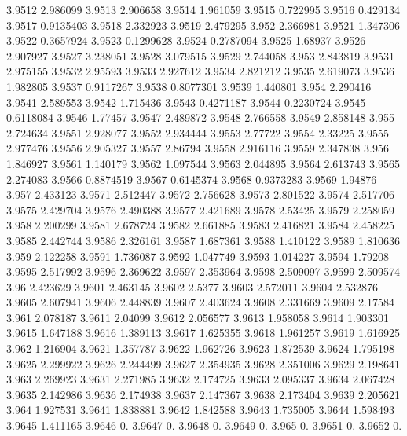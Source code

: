3.9512  2.986099
3.9513  2.906658
3.9514  1.961059
3.9515  0.722995
3.9516  0.429134
3.9517  0.9135403
3.9518  2.332923
3.9519  2.479295
3.952  2.366981
3.9521  1.347306
3.9522  0.3657924
3.9523  0.1299628
3.9524  0.2787094
3.9525  1.68937
3.9526  2.907927
3.9527  3.238051
3.9528  3.079515
3.9529  2.744058
3.953  2.843819
3.9531  2.975155
3.9532  2.95593
3.9533  2.927612
3.9534  2.821212
3.9535  2.619073
3.9536  1.982805
3.9537  0.9117267
3.9538  0.8077301
3.9539  1.440801
3.954  2.290416
3.9541  2.589553
3.9542  1.715436
3.9543  0.4271187
3.9544  0.2230724
3.9545  0.6118084
3.9546  1.77457
3.9547  2.489872
3.9548  2.766558
3.9549  2.858148
3.955  2.724634
3.9551  2.928077
3.9552  2.934444
3.9553  2.77722
3.9554  2.33225
3.9555  2.977476
3.9556  2.905327
3.9557  2.86794
3.9558  2.916116
3.9559  2.347838
3.956  1.846927
3.9561  1.140179
3.9562  1.097544
3.9563  2.044895
3.9564  2.613743
3.9565  2.274083
3.9566  0.8874519
3.9567  0.6145374
3.9568  0.9373283
3.9569  1.94876
3.957  2.433123
3.9571  2.512447
3.9572  2.756628
3.9573  2.801522
3.9574  2.517706
3.9575  2.429704
3.9576  2.490388
3.9577  2.421689
3.9578  2.53425
3.9579  2.258059
3.958  2.200299
3.9581  2.678724
3.9582  2.661885
3.9583  2.416821
3.9584  2.458225
3.9585  2.442744
3.9586  2.326161
3.9587  1.687361
3.9588  1.410122
3.9589  1.810636
3.959  2.122258
3.9591  1.736087
3.9592  1.047749
3.9593  1.014227
3.9594  1.79208
3.9595  2.517992
3.9596  2.369622
3.9597  2.353964
3.9598  2.509097
3.9599  2.509574
3.96  2.423629
3.9601  2.463145
3.9602  2.5377
3.9603  2.572011
3.9604  2.532876
3.9605  2.607941
3.9606  2.448839
3.9607  2.403624
3.9608  2.331669
3.9609  2.17584
3.961  2.078187
3.9611  2.04099
3.9612  2.056577
3.9613  1.958058
3.9614  1.903301
3.9615  1.647188
3.9616  1.389113
3.9617  1.625355
3.9618  1.961257
3.9619  1.616925
3.962  1.216904
3.9621  1.357787
3.9622  1.962726
3.9623  1.872539
3.9624  1.795198
3.9625  2.299922
3.9626  2.244499
3.9627  2.354935
3.9628  2.351006
3.9629  2.198641
3.963  2.269923
3.9631  2.271985
3.9632  2.174725
3.9633  2.095337
3.9634  2.067428
3.9635  2.142986
3.9636  2.174938
3.9637  2.147367
3.9638  2.173404
3.9639  2.205621
3.964  1.927531
3.9641  1.838881
3.9642  1.842588
3.9643  1.735005
3.9644  1.598493
3.9645  1.411165
3.9646  0.
3.9647  0.
3.9648  0.
3.9649  0.
3.965  0.
3.9651  0.
3.9652  0.
